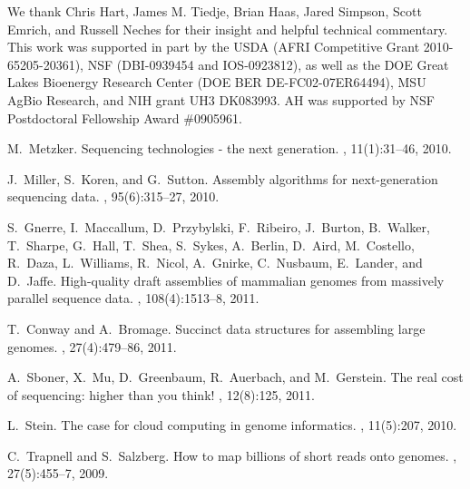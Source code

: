 \documentclass{pnastwo}
\begin{document}
\begin{article}
\begin{acknowledgments}

We thank Chris Hart, James M. Tiedje, Brian Haas, Jared Simpson, Scott
Emrich, and Russell Neches for their insight and helpful technical
commentary.  This work was supported in part by the USDA (AFRI
Competitive Grant 2010-65205-20361), NSF (DBI-0939454 and
IOS-0923812), as well as the DOE Great Lakes Bioenergy Research Center
(DOE BER DE-FC02-07ER64494), MSU AgBio Research, and NIH grant UH3
DK083993.  AH was supported by NSF Postdoctoral Fellowship Award
\#0905961.

\end{acknowledgments}

%
%

\begin{thebibliography}{20}

M.~Metzker.
\newblock Sequencing technologies - the next generation.
, 11(1):31--46, 2010.

J.~Miller, S.~Koren, and G.~Sutton.
\newblock Assembly algorithms for next-generation sequencing data.
, 95(6):315--27, 2010.

S.~Gnerre, I.~Maccallum, D.~Przybylski, F.~Ribeiro, J.~Burton, B.~Walker,
  T.~Sharpe, G.~Hall, T.~Shea, S.~Sykes, A.~Berlin, D.~Aird, M.~Costello,
  R.~Daza, L.~Williams, R.~Nicol, A.~Gnirke, C.~Nusbaum, E.~Lander, and
  D.~Jaffe.
\newblock High-quality draft assemblies of mammalian genomes from massively
  parallel sequence data.
, 108(4):1513--8, 2011.

T.~Conway and A.~Bromage.
\newblock Succinct data structures for assembling large genomes.
, 27(4):479--86, 2011.

A.~Sboner, X.~Mu, D.~Greenbaum, R.~Auerbach, and M.~Gerstein.
\newblock The real cost of sequencing: higher than you think!
, 12(8):125, 2011.

L.~Stein.
\newblock The case for cloud computing in genome informatics.
, 11(5):207, 2010.

C.~Trapnell and S.~Salzberg.
\newblock How to map billions of short reads onto genomes.
, 27(5):455--7, 2009.


\end{thebibliography}
\end{article}
\end{document}
